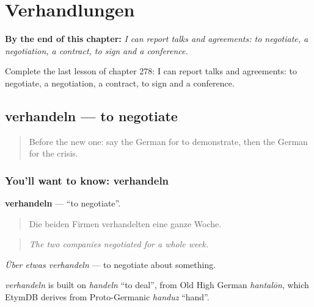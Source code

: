 
\chapter{Verhandlungen}
\label{ch:ge-verhandlungen}

\begin{chapteropening}
\textbf{By the end of this chapter:} \emph{I can report talks and agreements: to negotiate, a negotiation, a contract, to sign and a conference.}

Complete the last lesson of chapter 278: I can report talks and agreements: to negotiate, a negotiation, a contract, to sign and a conference.
\end{chapteropening}

\section[verhandeln]{verhandeln — to negotiate}

\label{lesson:GE-C278-verhandeln}



\begin{quote}
Before the new one: say the German for to demonstrate, then the German for the crisis.
\end{quote}

\subsection*{You'll want to know: verhandeln}
\textbf{verhandeln} — \textquotedblleft{}to negotiate\textquotedblright{}.

\begin{quote}
Die beiden Firmen verhandelten eine ganze Woche.
\end{quote}

\begin{quote}
\emph{The two companies negotiated for a whole week.}
\end{quote}

\emph{Über etwas verhandeln} — to negotiate about something.

\begin{cousinweb}
\emph{verhandeln} is built on \emph{handeln} \textquotedblleft{}to deal\textquotedblright{}, from Old High German \emph{hantalōn}, which EtymDB derives from Proto-Germanic \emph{handuz} \textquotedblleft{}hand\textquotedblright{}.
\end{cousinweb}


